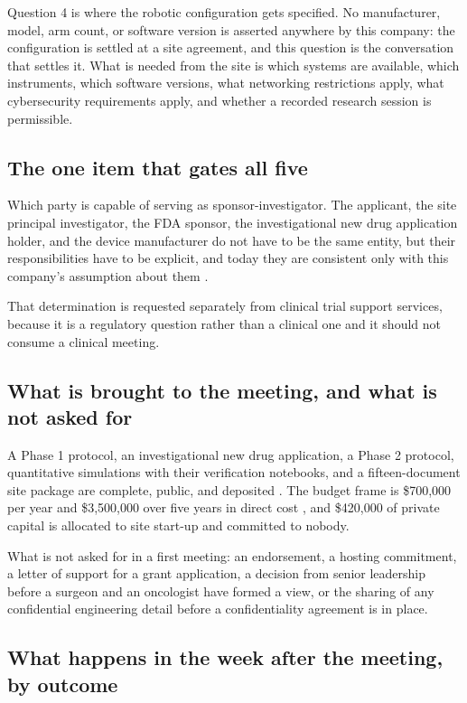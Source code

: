 Question 4 is where the robotic configuration gets specified. No manufacturer,
model, arm count, or software version is asserted anywhere by this company: the
configuration is settled at a site agreement, and this question is the
conversation that settles it. What is needed from the site is which systems are
available, which instruments, which software versions, what networking
restrictions apply, what cybersecurity requirements apply, and whether a recorded
research session is permissible.

\subsection{The one item that gates all five}

Which party is capable of serving as sponsor-investigator. The applicant, the
site principal investigator, the FDA sponsor, the investigational new drug
application holder, and the device manufacturer do not have to be the same
entity, but their responsibilities have to be explicit, and today they are
consistent only with this company's assumption about them
\cite{ecfr2026part312,ucsdactri2026}.

That determination is requested separately from clinical trial support services,
because it is a regulatory question rather than a clinical one and it should not
consume a clinical meeting.

\subsection{What is brought to the meeting, and what is not asked for}

A Phase 1 protocol, an investigational new drug application, a Phase 2 protocol,
quantitative simulations with their verification notebooks, and a fifteen-document
site package are complete, public, and deposited
\cite{onpremwhippl,phase1ind,phase2proto,qspmetpancre,movein2026}. The budget
frame is \$700,000 per year and \$3,500,000 over five years in direct cost
\cite{tenapps2026}, and \$420,000 of private capital is allocated to site
start-up and committed to nobody.

What is not asked for in a first meeting: an endorsement, a hosting commitment, a
letter of support for a grant application, a decision from senior leadership
before a surgeon and an oncologist have formed a view, or the sharing of any
confidential engineering detail before a confidentiality agreement is in place.

\subsection{What happens in the week after the meeting, by outcome}

